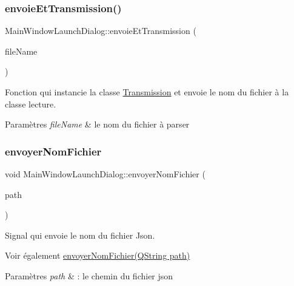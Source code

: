 \subsubsection{\texorpdfstring{envoie\+Et\+Transmission()}{envoieEtTransmission()}}
{\footnotesize\ttfamily Main\+Window\+Launch\+Dialog\+::envoie\+Et\+Transmission (\begin{DoxyParamCaption}\item[{Q\+String}]{file\+Name }\end{DoxyParamCaption})\hspace{0.3cm}{\ttfamily [private]}}



Fonction qui instancie la classe \hyperlink{classTransmission}{Transmission} et envoie le nom du fichier à la classe lecture. 


\begin{DoxyParams}{Paramètres}
{\em file\+Name} & le nom du fichier à parser \\
\hline
\end{DoxyParams}
\mbox{\label{classMainWindowLaunchDialog_a290aac8c91df612c4aeea9e4ba4a0897}} 
\subsubsection{\texorpdfstring{envoyer\+Nom\+Fichier}{envoyerNomFichier}}
{\footnotesize\ttfamily void Main\+Window\+Launch\+Dialog\+::envoyer\+Nom\+Fichier (\begin{DoxyParamCaption}\item[{Q\+String}]{path }\end{DoxyParamCaption})\hspace{0.3cm}{\ttfamily [signal]}}



Signal qui envoie le nom du fichier Json. 

\begin{DoxySeeAlso}{Voir également}
\hyperlink{classMainWindowLaunchDialog_a290aac8c91df612c4aeea9e4ba4a0897}{envoyer\+Nom\+Fichier(\+Q\+String path)} 
\end{DoxySeeAlso}

\begin{DoxyParams}{Paramètres}
{\em path} & \+: le chemin du fichier json \\
\hline
\end{DoxyParams}
\mbox{\label{classMainWindowLaunchDialog_a91bfa59302a3591b7b3b11b03d6f9b0e}} 
